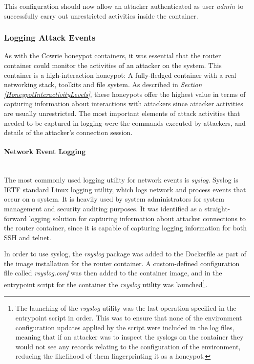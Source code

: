 This configuration should now allow an attacker authenticated as user \textit{admin} to successfully carry out unrestricted activities inside the container.


\subsubsection{Logging Attack Events}
As with the Cowrie honeypot containers, it was essential that the router container could monitor the activities of an attacker on the system. This container is a high-interaction honeypot: A fully-fledged container with a real networking stack, toolkits and file system. As described in \textit{Section \ref{HoneypotInteractivityLevels}}, these honeypots offer the highest value in terms of capturing information about interactions with attackers since attacker activities are usually unrestricted. The most important elements of attack activities that needed to be captured in logging were the commands executed by attackers, and details of the attacker's connection session. 

 \paragraph{Network Event Logging}\mbox{}\\
  The most commonly used logging utility for network events is \textit{syslog}. Syslog is IETF standard Linux logging utility, which logs network and process events that occur on a system. It is heavily used by system administrators for system management and security auditing purposes. \cite{rfc5424} It was identified as a straight-forward logging solution for capturing information about attacker connections to the router container, since it is capable of capturing logging information for both SSH and telnet.
  
 In order to use syslog, the \textit{rsyslog} package was added to the Dockerfile as part of the image installation for the router container. A custom-defined configuration file called \textit{rsyslog.conf} was then added to the container image, and in the entrypoint script for the container the \textit{rsyslog} utility was launched\footnote{The launching of the \textit{rsyslog} utility was the last operation specified in the entrypoint script in order. This was to ensure that none of the environment configuration updates applied by the script were included in the log files, meaning that if an attacker was to inspect the syslogs on the container they would not see any records relating to the configuration of the environment, reducing the likelihood of them fingerprinting it as a honeypot.}. 
  
